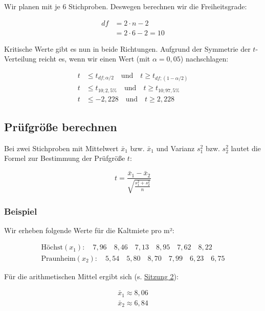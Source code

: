 \documentclass[
  11pt,
  ngerman,
  a4paper,
]{report}
\begin{document}
Wir planen mit je 6 Stichproben. Deswegen berechnen wir die Freiheitsgrade:

\[\begin{aligned}
\mathit{df}&=2\cdot n -2\\[4pt]
&=2\cdot6-2=10 
\end{aligned}\]

Kritische Werte gibt es nun in beide Richtungen. Aufgrund der Symmetrie der \(t\)-Verteilung reicht es, wenn wir einen Wert (mit \(\alpha=0{,}05\)) nachschlagen:

\[\begin{aligned}
t &\leq t_{\mathit{df};\alpha/2} \quad \textrm{und} \quad t \geq t_{\mathit{df};(1-\alpha/2)}\\[4pt]
t &\leq t_{10;2{,}5\%} \quad \textrm{und} \quad t \geq t_{10;97{,}5\%}\\[4pt]
t &\leq -2{,}228 \quad \textrm{und} \quad t \geq 2{,}228
\end{aligned}\]

\hypertarget{pruxfcfgruxf6uxdfe-berechnen-2}{%
\subsection{Prüfgröße berechnen}\label{pruxfcfgruxf6uxdfe-berechnen-2}}

Bei zwei Stichproben mit Mittelwert \(\bar{x}_1\) bzw. \(\bar{x}_1\) und Varianz \(s^2_1\) bzw. \(s^2_2\) lautet die Formel zur Bestimmung der Prüfgröße \(t\):

\[
t=\frac{\bar{x}_1-\bar{x}_2}{\sqrt{\frac{s^2_1+s^2_2}{n}}}
\label{eq:t2sp}
\]

\hypertarget{beispiel-15}{%
\subsubsection{Beispiel}\label{beispiel-15}}

Wir erheben folgende Werte für die Kaltmiete pro m²:

\[\begin{aligned}
\textrm{Höchst} (x_1):\quad7{,}96\quad8{,}46\quad7{,}13\quad8{,}95\quad7{,}62\quad8{,}22\\[4pt]
\textrm{Praunheim} (x_2):\quad5{,}54\quad5{,}80\quad8{,}70\quad7{,}99\quad6{,}23\quad6{,}75
\end{aligned}\]

Für die arithmetischen Mittel ergibt sich (s. \protect\hyperlink{arithmetisches-mittel}{Sitzung 2}):

\[\begin{aligned}
\bar{x}_1\approx8{,}06\\[4pt]
\bar{x}_2\approx6{,}84
\end{aligned}\]
\end{document}
